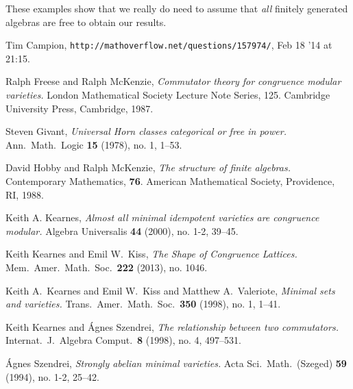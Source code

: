 These examples show that we really do need to assume that
\emph{all}
finitely generated algebras are free to obtain our results.


\begin{thebibliography}{10}

  Tim  Campion,    {\tt http://mathoverflow.net/questions/157974/},
  Feb 18 '14 at 21:15.

Ralph Freese and Ralph McKenzie, 
{\sl Commutator theory for congruence modular varieties.} 
London Mathematical Society Lecture Note Series, 125. 
Cambridge University Press, Cambridge, 1987. 

Steven Givant, 
{\it Universal Horn classes categorical or free in power.}
Ann.\ Math.\ Logic {\bf 15} (1978), no. 1, 1--53.

David  Hobby and Ralph McKenzie, 
  {\sl The structure of finite algebras.}
  Contemporary Mathematics, {\bf 76}.
  American Mathematical Society, Providence, RI, 1988.

Keith A.  Kearnes, 
    {\it Almost all minimal idempotent varieties are congruence modular.}
    Algebra Universalis {\bf 44} (2000), no. 1-2, 39--45.
  
Keith Kearnes and Emil W.\ Kiss, 
{\sl The Shape of Congruence Lattices.}
Mem.\ Amer.\ Math.\ Soc.\ {\bf 222} (2013), no. 1046.

  Keith A.\ Kearnes and Emil W.\ Kiss and Matthew A.\ Valeriote, 
  {\it Minimal sets and varieties.}
  Trans.\ Amer.\ Math.\ Soc.\ {\bf 350} (1998), no. 1, 1--41.

Keith Kearnes and \'Agnes Szendrei, 
  {\it The relationship between two commutators.}
  Internat.\ J.\ Algebra Comput.\ {\bf 8} (1998), no. 4, 497--531.

  \'Agnes Szendrei, 
{\it Strongly abelian minimal varieties.}
Acta Sci.\ Math.\ (Szeged) {\bf 59} (1994), no. 1-2, 25--42. 
  
  
\end{thebibliography}


